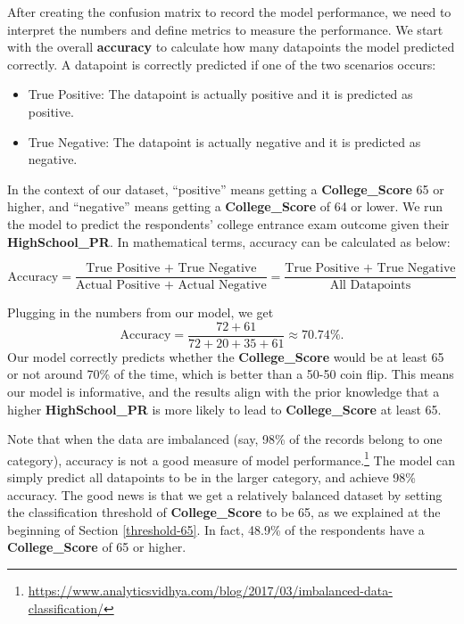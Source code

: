 \documentclass[
]{article}
\newenvironment{Shaded}{\begin{snugshade}}{\end{snugshade}}
\newcommand{\AttributeTok}[1]{\textcolor[rgb]{0.77,0.63,0.00}{#1}}
\newcommand{\DecValTok}[1]{\textcolor[rgb]{0.00,0.00,0.81}{#1}}
\newcommand{\FunctionTok}[1]{\textcolor[rgb]{0.00,0.00,0.00}{#1}}
\newcommand{\NormalTok}[1]{#1}
\newcommand{\SpecialCharTok}[1]{\textcolor[rgb]{0.00,0.00,0.00}{#1}}
\newcommand{\StringTok}[1]{\textcolor[rgb]{0.31,0.60,0.02}{#1}}
\providecommand{\tightlist}{%
  \setlength{\itemsep}{0pt}\setlength{\parskip}{0pt}}
\begin{document}
After creating the confusion matrix to record the model performance, we
need to interpret the numbers and define metrics to measure the
performance. We start with the overall \textbf{accuracy} to calculate
how many datapoints the model predicted correctly. A datapoint is
correctly predicted if one of the two scenarios occurs:

\begin{itemize}
\tightlist
\item
  True Positive: The datapoint is actually positive and it is predicted
  as positive.
\item
  True Negative: The datapoint is actually negative and it is predicted
  as negative.
\end{itemize}

In the context of our dataset, ``positive'' means getting a
\textbf{College\_Score} 65 or higher, and ``negative'' means getting a
\textbf{College\_Score} of 64 or lower. We run the model to predict the
respondents' college entrance exam outcome given their
\textbf{HighSchool\_PR}. In mathematical terms, accuracy can be
calculated as below:

\[\text{Accuracy} = \dfrac{\text{True Positive + True Negative}}{\text{Actual Positive + Actual Negative}} = \dfrac{\text{True Positive + True Negative}}{\text{All Datapoints}}\]

Plugging in the numbers from our model, we get
\[\text{Accuracy} = \dfrac{72+61}{72+20+35+61} \approx 70.74\%.\] Our
model correctly predicts whether the \textbf{College\_Score} would be at
least 65 or not around 70\% of the time, which is better than a 50-50
coin flip. This means our model is informative, and the results align
with the prior knowledge that a higher \textbf{HighSchool\_PR} is more
likely to lead to \textbf{College\_Score} at least 65.

Note that when the data are imbalanced (say, 98\% of the records belong
to one category), accuracy is not a good measure of model
performance.\footnote{\url{https://www.analyticsvidhya.com/blog/2017/03/imbalanced-data-classification/}}
The model can simply predict all datapoints to be in the larger
category, and achieve 98\% accuracy. The good news is that we get a
relatively balanced dataset by setting the classification threshold of
\textbf{College\_Score} to be 65, as we explained at the beginning of
Section \ref{threshold-65}. In fact, 48.9\% of the respondents have a
\textbf{College\_Score} of 65 or higher.

\begin{Shaded}
\end{Shaded}
\end{document}
